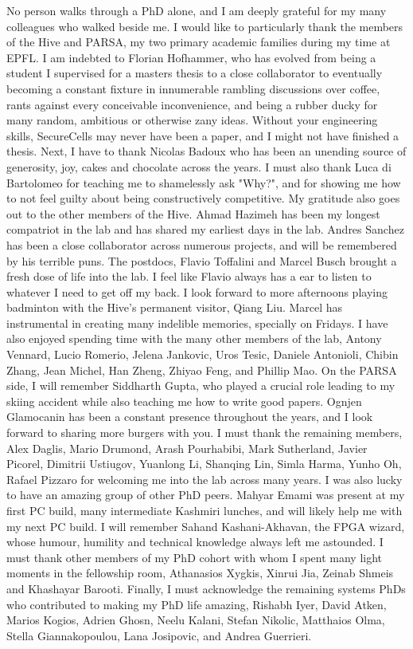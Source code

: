 No person walks through a PhD alone, and I am deeply grateful for my
many colleagues who walked beside me.
I would like to particularly thank the members of the Hive and PARSA, my two 
primary academic families during my time at EPFL. 
I am indebted to Florian Hofhammer, who has evolved from being a
student I supervised for a masters thesis to a close collaborator to
eventually becoming a constant fixture in 
innumerable rambling discussions over coffee,
rants against every conceivable inconvenience, and 
being a rubber ducky for many random, ambitious or otherwise zany ideas.
Without your engineering skills, SecureCells may never have been a
paper, and I might not have finished a thesis.
Next, I have to thank Nicolas Badoux who has been an unending source of generosity, 
joy, cakes and chocolate across the years.
I must also thank Luca di Bartolomeo for teaching me to shamelessly ask "Why?",
and for showing me how to not feel guilty about being constructively competitive.
My gratitude also goes out to the other members of the Hive.
Ahmad Hazimeh has been my longest compatriot in the lab and has shared
my earliest days in the lab.
Andres Sanchez has been a close collaborator across numerous projects, and
will be remembered by his terrible puns.
The postdocs, Flavio Toffalini and Marcel Busch brought a fresh dose of life into the lab. 
I feel like Flavio always has a ear to listen to whatever I need to get off my back.
I look forward to more afternoons playing badminton with the Hive's permanent
visitor, Qiang Liu.
Marcel has instrumental in creating many indelible memories, specially on Fridays.
I have also enjoyed spending time with the many other members of the lab, 
Antony Vennard, Lucio Romerio, Jelena Jankovic, Uros Tesic, Daniele Antonioli,
Chibin Zhang, Jean Michel, Han Zheng, Zhiyao Feng, and Phillip Mao.
On the PARSA side, I will remember Siddharth Gupta, who played a crucial role leading
to my skiing accident while also teaching me how to write good papers.
Ognjen Glamocanin has been a constant presence throughout the years, and I 
look forward to sharing more burgers with you.
I must thank the remaining members, Alex Daglis, Mario Drumond, Arash Pourhabibi,
Mark Sutherland, Javier Picorel, Dimitrii Ustiugov,
Yuanlong Li, Shanqing Lin, Simla Harma, Yunho Oh, Rafael Pizzaro 
for welcoming me into the lab across many years.
I was also lucky to have an amazing group of other PhD peers.
Mahyar Emami was present at my first PC build, many intermediate Kashmiri lunches,
and will likely help me with my next PC build.
I will remember Sahand Kashani-Akhavan, the FPGA wizard, whose humour, 
humility and technical knowledge always left me astounded.
I must thank other members of my PhD cohort with whom I spent many light
moments in the fellowship room, Athanasios Xygkis, Xinrui Jia, Zeinab Shmeis and
Khashayar Barooti.
Finally, I must acknowledge the remaining systems PhDs who contributed to
making my PhD life amazing, Rishabh Iyer, David Atken, Marios Kogios, Adrien Ghosn,
Neelu Kalani, Stefan Nikolic, Matthaios Olma, Stella Giannakopoulou,
Lana Josipovic,  and Andrea Guerrieri. 

